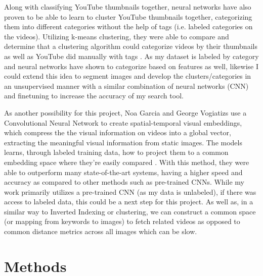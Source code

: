 \documentclass[10pt,twocolumn]{article}
\begin{document}
Along with classifying YouTube thumbnails together, neural networks have also proven to be able to learn to cluster YouTube thumbnails together, categorizing them into different categories without the help of tags (i.e. labeled categories on the videos). Utilizing k-means clustering, they were able to compare and determine that a clustering algorithm could categorize videos by their thumbnails as well as YouTube did manually with tags \cite{Stanford2021}. As my dataset is labeled by category and neural networks have shown to categorize based on features as well, likewise I could extend this idea to segment images and develop the clusters/categories in an unsupervised manner with a similar combination of neural networks (CNN) and finetuning to increase the accuracy of my search tool.

As another possibility for this project, Noa Garcia and George Vogiatizs use a Convolutional Neural Network to create spatial-temporal visual embeddings, which compress the the visual information on videos into a global vector, extracting the meaningful visual information from static images. The models learns, through labeled training data, how to project them to a common embedding space where they're easily compared \cite{Garcia2018}. With this method, they were able to outperform many state-of-the-art systems, having a higher speed and accuracy as compared to other methods such as pre-trained CNNs. While my work primarily utilizes a pre-trained CNN (as my data is unlabeled), if there was access to labeled data, this could be a next step for this project. As well as, in a similar way to Inverted Indexing or clustering, we can construct a common space (or mapping from keywords to images) to fetch related videos as opposed to common distance metrics across all images which can be slow.

\section {Methods}
\end{document}

